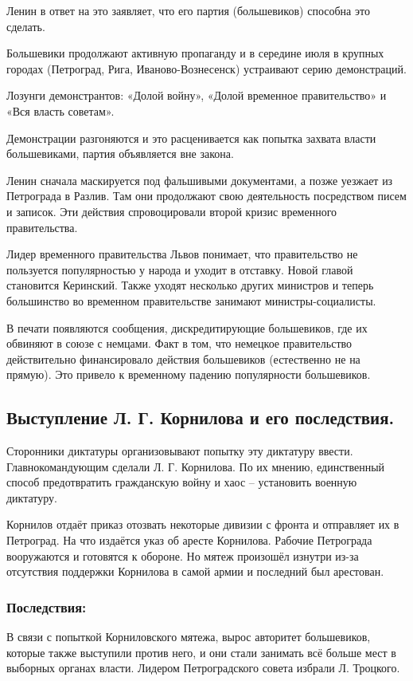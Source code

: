 Ленин в ответ на это заявляет, что его партия (большевиков) способна это сделать.

Большевики продолжают активную пропаганду и в середине июля в крупных городах (Петроград, Рига, Иваново-Вознесенск) устраивают серию демонстраций.

Лозунги демонстрантов: «Долой войну», «Долой временное правительство» и «Вся власть советам».

Демонстрации разгоняются и это расценивается как попытка захвата власти большевиками, партия объявляется вне закона.

Ленин сначала маскируется под фальшивыми документами, а позже уезжает из Петрограда в Разлив. Там они продолжают свою деятельность посредством писем и записок. Эти действия спровоцировали второй кризис временного правительства.

Лидер временного правительства Львов понимает, что правительство не пользуется популярностью у народа и уходит в отставку. Новой главой становится Керинский. Также уходят несколько других министров и теперь большинство во временном правительстве занимают министры-социалисты.

В печати появляются сообщения, дискредитирующие большевиков, где их обвиняют в союзе с немцами. Факт в том, что немецкое правительство действительно финансировало действия большевиков (естественно не на прямую). Это привело к временному падению популярности большевиков.

\subsection{Выступление Л. Г. Корнилова и его последствия.}

Сторонники диктатуры организовывают попытку эту диктатуру ввести. Главнокомандующим сделали Л. Г. Корнилова. По их мнению, единственный способ предотвратить гражданскую войну и хаос – установить военную диктатуру.

Корнилов отдаёт приказ отозвать некоторые дивизии с фронта и отправляет их в Петроград. На что издаётся указ об аресте Корнилова. Рабочие Петрограда вооружаются и готовятся к обороне. Но мятеж произошёл изнутри из-за отсутствия поддержки Корнилова в самой армии и последний был арестован.

\subsubsection{\textbf{Последствия:}}

В связи с попыткой Корниловского мятежа, вырос авторитет большевиков, которые также выступили против него, и они стали занимать всё больше мест в выборных органах власти. Лидером Петроградского совета избрали Л. Троцкого.

